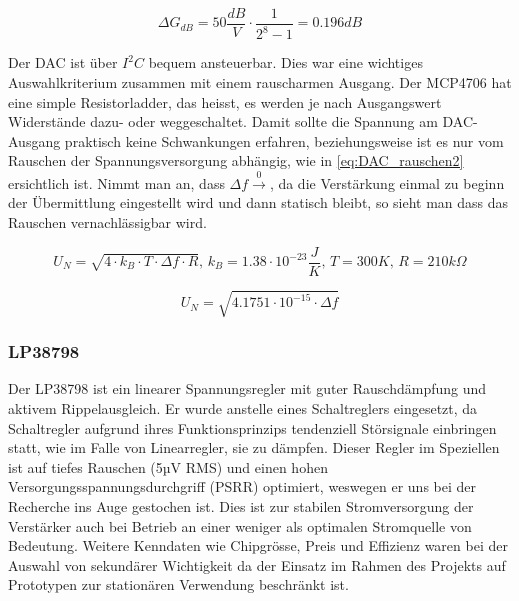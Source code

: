 \begin{equation}
    \Delta G_{dB} = 50 \frac{dB}{V} \cdot \frac{1}{2^8 - 1} = 0.196 dB
\label{eq:DAC_wert}
\end{equation}

Der DAC ist über $I^2 C$ bequem ansteuerbar. Dies war eine wichtiges Auswahlkriterium zusammen mit einem rauscharmen Ausgang. Der MCP4706 hat eine simple Resistorladder, das heisst, es werden je nach Ausgangswert Widerstände dazu- oder weggeschaltet. Damit sollte die Spannung am DAC-Ausgang praktisch keine Schwankungen erfahren, beziehungsweise ist es nur vom Rauschen der Spannungsversorgung abhängig, wie in \ref{eq:DAC_rauschen2} ersichtlich ist. Nimmt man an, dass $\Delta f \xrightarrow 0$, da die Verstärkung einmal zu beginn der Übermittlung eingestellt wird und dann statisch bleibt, so sieht man dass das Rauschen vernachlässigbar wird.

\begin{equation}
    U_N = \sqrt{4 \cdot k_B \cdot T \cdot \Delta f \cdot R},\,k_B = 1.38\cdot 10^{-23}\frac{J}{K},\,T = 300K,\,R = 210k\Omega
\label{eq:DAC_rauschen}
\end{equation}

\begin{equation}
    U_N = \sqrt{4.1751\cdot 10^{-15} \cdot \Delta f}
\label{eq:DAC_rauschen2}
\end{equation}

\subsubsection{LP38798}
Der LP38798 ist ein linearer Spannungsregler mit guter Rauschdämpfung und aktivem Rippelausgleich. Er wurde anstelle eines Schaltreglers eingesetzt, da Schaltregler aufgrund ihres Funktionsprinzips tendenziell Störsignale einbringen statt, wie im Falle von Linearregler, sie zu dämpfen.
Dieser Regler im Speziellen ist auf tiefes Rauschen (5µV RMS) und einen hohen Versorgungsspannungsdurchgriff (PSRR) optimiert, weswegen er uns bei der Recherche ins Auge gestochen ist. Dies ist zur stabilen Stromversorgung der Verstärker auch bei Betrieb an einer weniger als optimalen Stromquelle von Bedeutung.
Weitere Kenndaten wie Chipgrösse, Preis und Effizienz waren bei der Auswahl von sekundärer Wichtigkeit da der Einsatz im Rahmen des Projekts auf Prototypen zur stationären Verwendung beschränkt ist.

